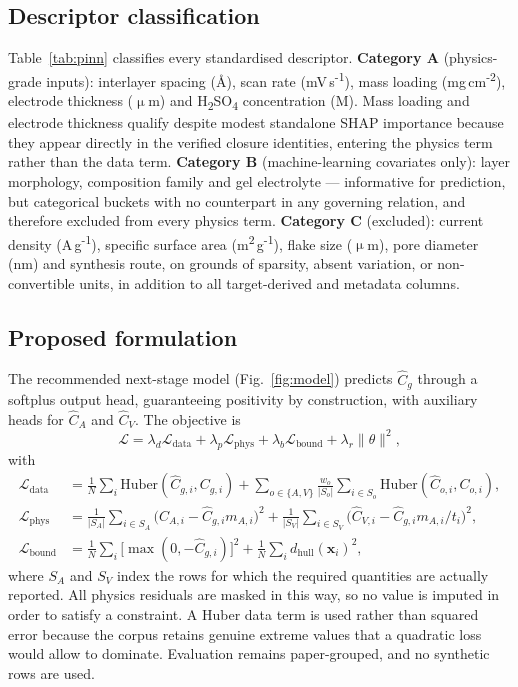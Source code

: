 \subsection{Descriptor classification}
Table~\ref{tab:pinn} classifies every standardised descriptor.
\textbf{Category A} (physics-grade inputs): interlayer spacing (\AA), scan rate (mV\,s\textsuperscript{-1}), mass loading (mg\,cm\textsuperscript{-2}), electrode thickness ($\upmu$m) and H\textsubscript{2}SO\textsubscript{4} concentration (M). Mass loading and electrode
thickness qualify despite modest standalone SHAP importance because they appear directly in
the verified closure identities, entering the physics term rather than the data term.
\textbf{Category B} (machine-learning covariates only): layer morphology, composition family and gel electrolyte --- informative for
prediction, but categorical buckets with no counterpart in any governing relation, and
therefore excluded from every physics term.
\textbf{Category C} (excluded): current density (A\,g\textsuperscript{-1}), specific surface area (m\textsuperscript{2}\,g\textsuperscript{-1}), flake size ($\upmu$m), pore diameter (nm) and synthesis route, on grounds of
sparsity, absent variation, or non-convertible units, in addition to all target-derived and
metadata columns.

\subsection{Proposed formulation}
The recommended next-stage model (Fig.~\ref{fig:model}) predicts $\hat C_g$ through a
softplus output head, guaranteeing positivity by construction, with auxiliary heads for
$\hat C_A$ and $\hat C_V$. The objective is
\begin{equation}
\mathcal{L} = \lambda_{d}\mathcal{L}_{\mathrm{data}}
+ \lambda_{p}\mathcal{L}_{\mathrm{phys}}
+ \lambda_{b}\mathcal{L}_{\mathrm{bound}}
+ \lambda_{r}\lVert\theta\rVert^{2},
\label{eq:loss}
\end{equation}
with
\begin{align}
\mathcal{L}_{\mathrm{data}} &= \frac{1}{N}\sum_{i}
  \mathrm{Huber}\!\left(\hat C_{g,i}, C_{g,i}\right)
  + \sum_{o \in \{A,V\}} \frac{w_o}{|S_o|}\sum_{i \in S_o}
  \mathrm{Huber}\!\left(\hat C_{o,i}, C_{o,i}\right), \\
\mathcal{L}_{\mathrm{phys}} &= \frac{1}{|S_A|}\sum_{i \in S_A}
  \bigl(\hat C_{A,i} - \hat C_{g,i} m_{A,i}\bigr)^{2}
  + \frac{1}{|S_V|}\sum_{i \in S_V}
  \bigl(\hat C_{V,i} - \hat C_{g,i} m_{A,i}/t_i\bigr)^{2}, \\
\mathcal{L}_{\mathrm{bound}} &= \frac{1}{N}\sum_{i}
  \bigl[\max(0, -\hat C_{g,i})\bigr]^{2}
  + \frac{1}{N}\sum_{i} d_{\mathrm{hull}}(\mathbf{x}_i)^{2},
\end{align}
where $S_A$ and $S_V$ index the rows for which the required quantities are actually reported.
All physics residuals are masked in this way, so no value is imputed in order to satisfy a
constraint. A Huber data term is used rather than squared error because the corpus retains
genuine extreme values that a quadratic loss would allow to dominate. Evaluation remains
paper-grouped, and no synthetic rows are used.

